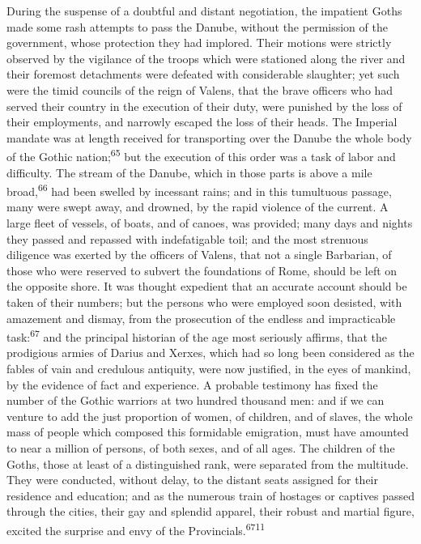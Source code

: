 During the suspense of a doubtful and distant negotiation, the
impatient Goths made some rash attempts to pass the Danube,
without the permission of the government, whose protection they
had implored. Their motions were strictly observed by the
vigilance of the troops which were stationed along the river and
their foremost detachments were defeated with considerable
slaughter; yet such were the timid councils of the reign of
Valens, that the brave officers who had served their country in
the execution of their duty, were punished by the loss of their
employments, and narrowly escaped the loss of their heads. The
Imperial mandate was at length received for transporting over the
Danube the whole body of the Gothic nation;\textsuperscript{65} but the execution
of this order was a task of labor and difficulty. The stream of
the Danube, which in those parts is above a mile broad,\textsuperscript{66} had
been swelled by incessant rains; and in this tumultuous passage,
many were swept away, and drowned, by the rapid violence of the
current. A large fleet of vessels, of boats, and of canoes, was
provided; many days and nights they passed and repassed with
indefatigable toil; and the most strenuous diligence was exerted
by the officers of Valens, that not a single Barbarian, of those
who were reserved to subvert the foundations of Rome, should be
left on the opposite shore. It was thought expedient that an
accurate account should be taken of their numbers; but the
persons who were employed soon desisted, with amazement and
dismay, from the prosecution of the endless and impracticable
task:\textsuperscript{67} and the principal historian of the age most seriously
affirms, that the prodigious armies of Darius and Xerxes, which
had so long been considered as the fables of vain and credulous
antiquity, were now justified, in the eyes of mankind, by the
evidence of fact and experience. A probable testimony has fixed
the number of the Gothic warriors at two hundred thousand men:
and if we can venture to add the just proportion of women, of
children, and of slaves, the whole mass of people which composed
this formidable emigration, must have amounted to near a million
of persons, of both sexes, and of all ages. The children of the
Goths, those at least of a distinguished rank, were separated
from the multitude. They were conducted, without delay, to the
distant seats assigned for their residence and education; and as
the numerous train of hostages or captives passed through the
cities, their gay and splendid apparel, their robust and martial
figure, excited the surprise and envy of the Provincials.\textsuperscript{6711}

